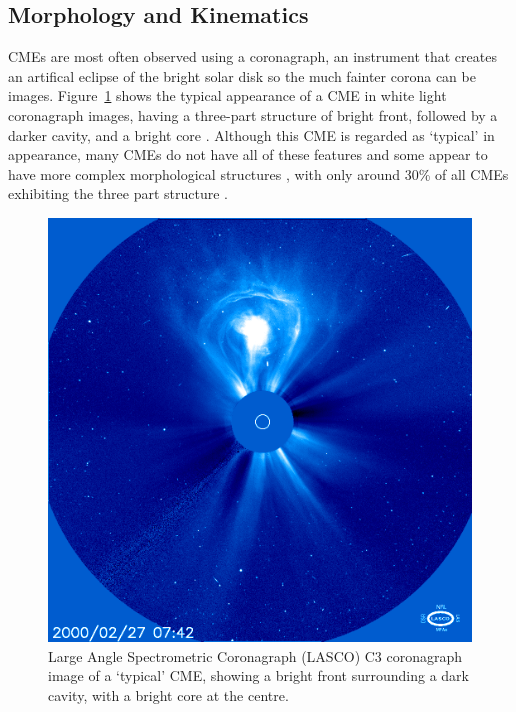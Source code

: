 \subsection{Morphology and Kinematics} 


CMEs are most often observed using a coronagraph, an instrument that creates an artifical eclipse of the bright solar disk so the much fainter corona can be images. Figure~\ref{fig:lasco_c3} shows the typical appearance of a CME in white light coronagraph images, having a three-part structure of bright front, followed by a darker cavity, and a bright core \citep{illing1985}. Although this CME is regarded as \textquoteleft typical' in appearance, many CMEs do not have all of these features and some appear to have more complex morphological structures \citep{pick2006}, with only around 30\% of all CMEs exhibiting the three part structure \citep{webbHu1987}. 
\begin{figure}[t!]
\begin{center}
\includegraphics[scale=0.45]{images/lasco_c3}
\caption[LASCO C3 image of a CME]{Large Angle Spectrometric Coronagraph (LASCO) C3 coronagraph image of a \textquoteleft typical' CME, showing  a bright front surrounding a dark cavity, with a bright core at the centre.}
\label{fig:lasco_c3}
\end{center}
\end{figure}
